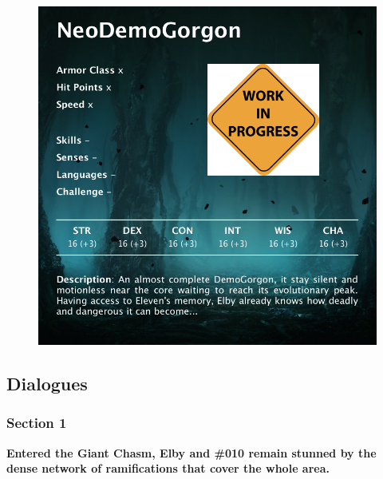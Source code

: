 \begin{figure}[H]
	\centering
	\includegraphics[width=0.7\linewidth]{images/visual_stats/neodemogorgon.png}
\end{figure}





\newpage

\subsection{Dialogues}

\subsubsection{Section 1}
\vspace*{0.3cm}

	\textbf{Entered the Giant Chasm, Elby and \#010 remain stunned by the dense network of ramifications that cover the whole area.}

